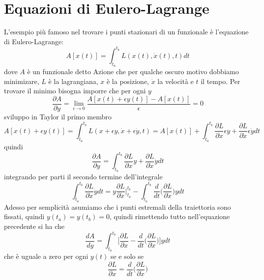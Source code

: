 \documentclass[11pt,a4paper]{article}
\theoremstyle{definition}
\theoremstyle{plain}
\theoremstyle{plain}
\begin{document}
	\section{Equazioni di Eulero-Lagrange}
		L'esempio più famoso nel trovare i punti stazionari di un funzionale è l'equazione di Eulero-Lagrange:
		\begin{equation}
			A[x(t)]=\int_{t_a}^{t_b}L(x(t),\dot{x}(t),t)dt
		\end{equation}
		dove $A$ è un funzionale detto Azione che per qualche oscuro motivo dobbiamo minimizare, $L$ è la lagrangiana, $x$ è la posizione, $\dot{x}$ la velocità e $t$ il tempo.
		Per trovare il minimo bisogna imporre che per ogni $y$
		\[
			\frac{\partial A}{\partial y}=\lim_{\epsilon \to 0}\frac{A[x(t)+\epsilon y(t)]-A[x(t)]}{\epsilon}=0
		\]
		sviluppo in Taylor il primo membro
		\[
			A[x(t)+\epsilon y(t)]=\int_{t_a}^{t_b}L(x+\epsilon y,\dot{x}+\epsilon \dot{y},t)=A[x(t)]+\int_{t_a}^{t_b}\frac{\partial{L}}{\partial{x}}\epsilon y+\frac{\partial{L}}{\partial{\dot{x}}}\epsilon \dot{y}dt
		\]
		quindi
		\[
			\frac{\partial A}{\partial y}=\int_{t_a}^{t_b}\frac{\partial{L}}{\partial{x}}y+\frac{\partial{L}}{\partial{\dot{x}}}\dot{y}dt
		\]
		integrando per parti il secondo termine dell'integrale
		\[
			\int_{t_a}^{t_b}\frac{\partial{L}}{\partial{\dot{x}}}\dot{y}dt=y\frac{\partial{L}}{\partial{\dot{x}}}\bigg\rvert_{t_a}^{t_b}-
			\int_{t_a}^{t_b}\frac{d}{dt}\bigg(\frac{\partial{L}}{\partial{\dot{x}}} \bigg)ydt
		\]
		Adesso per semplicità asumiamo che i punti estremali della traiettoria sono fissati, quindi $y(t_a)=y(t_b)=0$, quindi rimettendo tutto nell'equazione precedente si ha che
		\begin{equation}
			\frac{dA}{dy}=\int_{t_a}^{t_b}\bigg[\frac{\partial{L}}{\partial{x}}-\frac{d}{dt}\bigg(\frac{\partial{L}}{\partial{\dot{x}}} \bigg)\bigg]ydt
		\end{equation}
		che è uguale a zero per ogni $y(t)$ se e solo se 
		\begin{equation}
			\frac{\partial{L}}{\partial{x}}=\frac{d}{dt}\bigg(\frac{\partial{L}}{\partial{\dot{x}}} \bigg)
		\end{equation}
\end{document}
